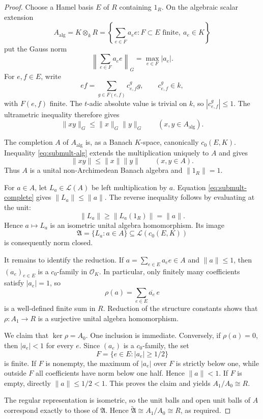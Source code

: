 \documentclass[11pt]{article}
\newcommand{\cO}{\mathcal O}
\newcommand{\cA}{\mathfrak A}
\newcommand{\cL}{\mathcal L}
\begin{document}
\begin{proof}
Choose a Hamel basis $E$ of $R$ containing $1_R$.  On the algebraic scalar
extension
\[
 A_{\mathrm{alg}}=K\otimes_kR
 =\left\{\sum_{e\in F}a_e e:F\subset E\text{ finite},\ a_e\in K\right\}
\]
put the Gauss norm
\[
 \left\|\sum_{e\in F}a_e e\right\|_G=\max_{e\in F}|a_e|.
\]
For $e,f\in E$, write
\[
 ef=\sum_{g\in F(e,f)}c_{e,f}^g g,
 \qquad c_{e,f}^g\in k,
\]
with $F(e,f)$ finite.  The $t$-adic absolute value is trivial on $k$, so
$|c_{e,f}^g|\leq1$.  The ultrametric inequality therefore gives
\begin{equation}\label{eq:submult-alg}
 \|xy\|_G\leq\|x\|_G\|y\|_G
 \qquad(x,y\in A_{\mathrm{alg}}).
\end{equation}

The completion $A$ of $A_{\mathrm{alg}}$ is, as a Banach $K$-space,
canonically $c_0(E,K)$.  Inequality \eqref{eq:submult-alg} extends the
multiplication uniquely to $A$ and gives
\begin{equation}\label{eq:submult-complete}
 \|xy\|\leq\|x\|\|y\|\qquad(x,y\in A).
\end{equation}
Thus $A$ is a unital non-Archimedean Banach algebra and $\|1_R\|=1$.

For $a\in A$, let $L_a\in\cL(A)$ be left multiplication by $a$.
Equation \eqref{eq:submult-complete} gives $\|L_a\|\leq\|a\|$.  The
reverse inequality follows by evaluating at the unit:
\[
 \|L_a\|\geq\|L_a(1_R)\|=\|a\|.
\]
Hence $a\mapsto L_a$ is an isometric unital algebra homomorphism.  Its
image
\[
 \cA=\{L_a:a\in A\}\subseteq\cL(c_0(E,K))
\]
is consequently norm closed.

It remains to identify the reduction.  If
$a=\sum_{e\in E}a_e e\in A$ and $\|a\|\leq1$, then $(a_e)_{e\in E}$ is a
$c_0$-family in $\cO_K$.  In particular, only finitely many coefficients
satisfy $|a_e|=1$, so
\begin{equation}\label{eq:rho}
 \rho(a)=\sum_{e\in E}\overline{a_e}\,e
\end{equation}
is a well-defined finite sum in $R$.  Reduction of the structure
constants shows that $\rho:A_1\to R$ is a surjective unital algebra
homomorphism.

We claim that $\ker\rho=A_0$.  One inclusion is immediate.  Conversely,
if $\rho(a)=0$, then $|a_e|<1$ for every $e$.  Since $(a_e)$ is a
$c_0$-family, the set
\[
 F=\{e\in E:|a_e|\geq 1/2\}
\]
is finite.  If $F$ is nonempty, the maximum of $|a_e|$ over $F$ is
strictly below one, while outside $F$ all coefficients have norm below
one half.  Hence $\|a\|<1$.  If $F$ is empty, directly
$\|a\|\leq1/2<1$.  This proves the claim and yields $A_1/A_0\cong R$.

The regular representation is isometric, so the unit balls and open unit
balls of $A$ correspond exactly to those of $\cA$.  Hence
$\widetilde{\cA}\cong A_1/A_0\cong R$, as required.
\end{proof}
\end{document}
